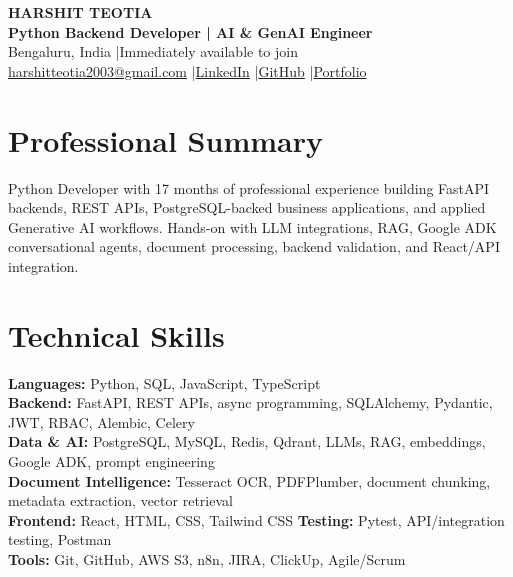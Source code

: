 \documentclass[a4paper,10pt]{article}
\begin{document}
\begin{center}
  {\Large\bfseries HARSHIT TEOTIA}\\[2pt]
  \textbf{Python Backend Developer | AI \& GenAI Engineer}\\[3pt]
  Bengaluru, India \enspace|\enspace Immediately available to join\\[2pt]
  \href{mailto:harshitteotia2003@gmail.com}{harshitteotia2003@gmail.com}
  \enspace|\enspace \href{https://www.linkedin.com/in/harshit-teotia/}{LinkedIn}
  \enspace|\enspace \href{https://github.com/HarshitTeotia}{GitHub}
  \enspace|\enspace \href{https://harshitteotia.github.io/Portfolio/}{Portfolio}
\end{center}
\vspace{-8pt}

\section*{Professional Summary}
Python Developer with 17 months of professional experience building FastAPI backends, REST APIs,
PostgreSQL-backed business applications, and applied Generative AI workflows. Hands-on with LLM integrations,
RAG, Google ADK conversational agents, document processing, backend validation, and React/API integration.

\section*{Technical Skills}
\textbf{Languages:} Python, SQL, JavaScript, TypeScript\\
\textbf{Backend:} FastAPI, REST APIs, async programming, SQLAlchemy, Pydantic, JWT, RBAC, Alembic, Celery\\
\textbf{Data \& AI:} PostgreSQL, MySQL, Redis, Qdrant, LLMs, RAG, embeddings, Google ADK, prompt engineering\\
\textbf{Document Intelligence:} Tesseract OCR, PDFPlumber, document chunking, metadata extraction, vector retrieval\\
\textbf{Frontend:} React, HTML, CSS, Tailwind CSS \quad \textbf{Testing:} Pytest, API/integration testing, Postman\\
\textbf{Tools:} Git, GitHub, AWS S3, n8n, JIRA, ClickUp, Agile/Scrum
\end{document}
